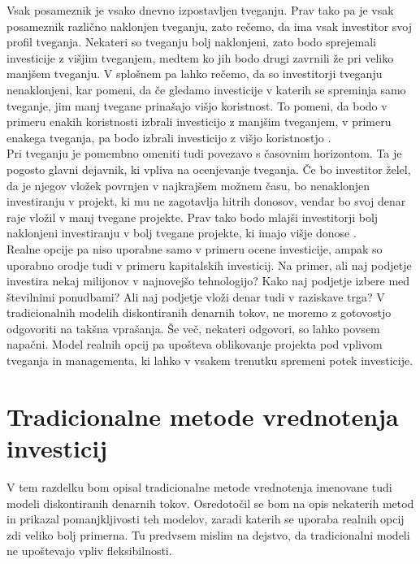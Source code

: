 Vsak posameznik je vsako dnevno izpostavljen tveganju. Prav tako pa je vsak posameznik različno naklonjen tveganju, zato rečemo, da ima vsak investitor svoj profil tveganja. Nekateri so tveganju bolj naklonjeni, zato bodo sprejemali investicije z višjim tveganjem, medtem ko jih bodo drugi zavrnili že pri veliko manjšem tveganju. V splošnem pa lahko rečemo, da so investitorji tveganju nenaklonjeni, kar pomeni, da če gledamo investicije v katerih se spreminja samo tveganje, jim manj tvegane prinašajo višjo koristnost. To pomeni, da bodo v primeru enakih koristnosti izbrali investicijo z manjšim tveganjem, v primeru enakega tveganja, pa bodo izbrali investicijo z višjo koristnostjo \cite{Crnigoj}. \\

Pri tveganju je pomembno omeniti tudi povezavo s časovnim horizontom. Ta je pogosto glavni dejavnik, ki vpliva na ocenjevanje tveganja. Če bo investitor želel, da je njegov vložek povrnjen v najkrajšem možnem času, bo nenaklonjen investiranju v projekt, ki mu ne zagotavlja hitrih donosov, vendar bo svoj denar raje vložil v manj tvegane projekte. Prav tako bodo mlajši investitorji bolj naklonjeni investiranju v bolj tvegane projekte, ki imajo višje donose \cite{investopedia}. \\

Realne opcije pa niso uporabne samo v primeru ocene investicije, ampak so uporabno orodje tudi v primeru kapitalskih investicij. Na primer, ali naj podjetje investira nekaj milijonov v najnovejšo tehnologijo? Kako naj podjetje izbere med številnimi ponudbami? Ali naj podjetje vloži denar tudi v raziskave trga? V tradicionalnih modelih diskontiranih denarnih tokov, ne moremo z gotovostjo odgovoriti na takšna vprašanja. Še več, nekateri odgovori, so lahko povsem napačni.  Model realnih opcij pa upošteva oblikovanje projekta pod vplivom tveganja in managementa, ki lahko v vsakem trenutku spremeni potek investicije. \\


\section{Tradicionalne metode vrednotenja investicij}
V tem razdelku bom opisal tradicionalne metode vrednotenja imenovane tudi modeli diskontiranih denarnih tokov. Osredotočil se bom na opis nekaterih metod in prikazal pomanjkljivosti teh modelov, zaradi katerih se uporaba realnih opcij zdi veliko bolj primerna. Tu predvsem mislim na dejstvo, da tradicionalni modeli ne upoštevajo vpliv fleksibilnosti.

